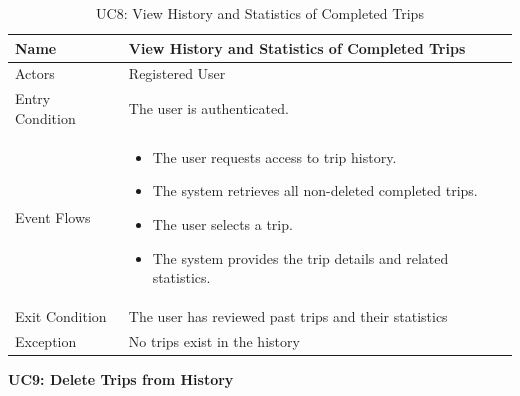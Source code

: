 \begin{table}[H]
    \centering
    \renewcommand{\arraystretch}{1.3}
    \begin{tabular}{|p{}|p{}|}
        \hline
        Name & \textbf{View History and Statistics of Completed Trips} \\
        \hline
        Actors & Registered User \\
        \hline
        Entry Condition & The user is authenticated.\\
        \hline
        Event Flows & \begin{itemize}[topsep=0pt, partopsep=0pt, leftmargin=*]
            \item The user requests access to trip history.
            \item The system retrieves all non-deleted completed trips.
            \item The user selects a trip.
            \item The system provides the trip details and related statistics.
        \end{itemize} \\
        \hline
        Exit Condition & The user has reviewed past trips and their statistics\\
        \hline
        Exception & No trips exist in the history\\
        \hline
    \end{tabular}
    \caption{UC8: View History and Statistics of Completed Trips}
    \label{uc8}
\end{table}

\vspace{12pt}
\noindent
\textbf{UC9: Delete Trips from History}

